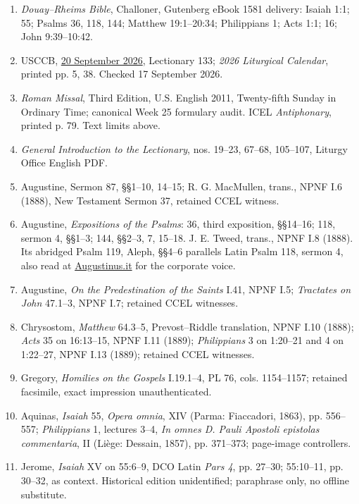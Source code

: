 \small
\begin{enumerate}[leftmargin=1.6em,itemsep=0.25em,parsep=0pt]
\item \textit{Douay--Rheims Bible}, Challoner, Gutenberg eBook 1581 delivery: Isaiah 1:1; 55; Psalms 36, 118, 144; Matthew 19:1--20:34; Philippians 1; Acts 1:1; 16; John 9:39--10:42.
\item USCCB, \href{https://bible.usccb.org/bible/readings/092026.cfm}{20 September 2026}, Lectionary 133; \textit{2026 Liturgical Calendar}, printed pp. 5, 38. Checked 17 September 2026.
\item \textit{Roman Missal}, Third Edition, U.S. English 2011, Twenty-fifth Sunday in Ordinary Time; canonical Week 25 formulary audit. ICEL \textit{Antiphonary}, printed p. 79. Text limits above.
\item \textit{General Introduction to the Lectionary}, nos. 19--23, 67--68, 105--107, Liturgy Office English PDF.
\item Augustine, Sermon 87, §§1--10, 14--15; R. G. MacMullen, trans., NPNF I.6 (1888), New Testament Sermon 37, retained CCEL witness.
\item Augustine, \textit{Expositions of the Psalms}: 36, third exposition, §§14--16; 118, sermon 4, §§1--3; 144, §§2--3, 7, 15--18. J. E. Tweed, trans., NPNF I.8 (1888). Its abridged Psalm 119, Aleph, §§4--6 parallels Latin Psalm 118, sermon 4, also read at \href{https://www.augustinus.it/latino/esposizioni_salmi/esposizione_salmo_148_testo.htm}{Augustinus.it} for the corporate voice.
\item Augustine, \textit{On the Predestination of the Saints} I.41, NPNF I.5; \textit{Tractates on John} 47.1--3, NPNF I.7; retained CCEL witnesses.
\item Chrysostom, \textit{Matthew} 64.3--5, Prevost--Riddle translation, NPNF I.10 (1888); \textit{Acts} 35 on 16:13--15, NPNF I.11 (1889); \textit{Philippians} 3 on 1:20--21 and 4 on 1:22--27, NPNF I.13 (1889); retained CCEL witnesses.
\item Gregory, \textit{Homilies on the Gospels} I.19.1--4, PL 76, cols. 1154--1157; retained facsimile, exact impression unauthenticated.
\item Aquinas, \textit{Isaiah} 55, \textit{Opera omnia}, XIV (Parma: Fiaccadori, 1863), pp. 556--557; \textit{Philippians} 1, lectures 3--4, \textit{In omnes D. Pauli Apostoli epistolas commentaria}, II (Liège: Dessain, 1857), pp. 371--373; page-image controllers.
\item Jerome, \textit{Isaiah} XV on 55:6--9, DCO Latin \textit{Pars 4}, pp. 27--30; 55:10--11, pp. 30--32, as context. Historical edition unidentified; paraphrase only, no offline substitute.

\end{enumerate}
